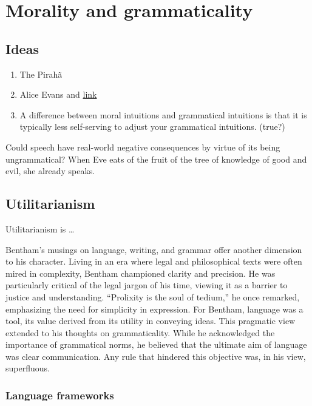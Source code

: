 \chapter{Morality and grammaticality}

\section{Ideas}
\begin{enumerate}
    \item The Pirahã
    \item Alice Evans and \href{https://www.youtube.com/watch?v=6gC8Mi_sOQU}{link}
    \item A difference between moral intuitions and grammatical intuitions is that it is typically less self-serving to adjust your grammatical intuitions. (true?)
\end{enumerate}

Could speech have real-world negative consequences by virtue of its being ungrammatical?
When Eve eats of the fruit of the tree of knowledge of good and evil, she already speaks.

\section{Utilitarianism}

Utilitarianism is \dots

Bentham's musings on language, writing, and grammar offer another dimension to his character. Living in an era where legal and philosophical texts were often mired in complexity, Bentham championed clarity and precision. He was particularly critical of the legal jargon of his time, viewing it as a barrier to justice and understanding. ``Prolixity is the soul of tedium,'' he once remarked, emphasizing the need for simplicity in expression. For Bentham, language was a tool, its value derived from its utility in conveying ideas. This pragmatic view extended to his thoughts on grammaticality. While he acknowledged the importance of grammatical norms, he believed that the ultimate aim of language was clear communication. Any rule that hindered this objective was, in his view, superfluous.

\subsection{Language frameworks}

